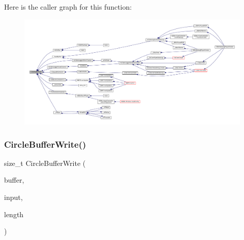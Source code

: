 Here is the caller graph for this function\+:
\nopagebreak
\begin{figure}[H]
\begin{center}
\leavevmode
\includegraphics[width=350pt]{circle-buffer_8c_a3cd592fc508fc16e0687ef249a7985f6_icgraph}
\end{center}
\end{figure}
\mbox{\label{circle-buffer_8c_a296b8a91ed215aae7b8627c4f42ece8b}} 
\subsubsection{\texorpdfstring{Circle\+Buffer\+Write()}{CircleBufferWrite()}}
{\footnotesize\ttfamily size\+\_\+t Circle\+Buffer\+Write (\begin{DoxyParamCaption}\item[{struct Circle\+Buffer $\ast$}]{buffer,  }\item[{const void $\ast$}]{input,  }\item[{size\+\_\+t}]{length }\end{DoxyParamCaption})}

